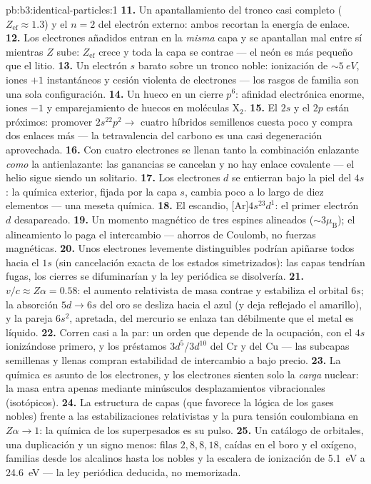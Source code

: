 \begin{solution}{pb:b3:identical-particles:1}
\textbf{11.} Un apantallamiento del tronco casi completo ($Z_{\text{ef}}
\approx 1.3$) y el $n = 2$ del electrón externo: ambos recortan la
energía de enlace.
\textbf{12.} Los electrones añadidos entran en la \emph{misma} capa y se
apantallan mal entre sí mientras $Z$ sube: $Z_{\text{ef}}$ crece
y toda la capa se contrae --- el neón es más pequeño que el litio.
\textbf{13.} Un electrón $s$ barato sobre un tronco noble: ionización de
$\sim\qty{5}{eV}$, iones $+1$ instantáneos y cesión violenta de electrones
--- los rasgos de familia son una sola configuración.
\textbf{14.} Un hueco en un cierre $p^6$: afinidad electrónica
enorme, iones $-1$ y emparejamiento de huecos en moléculas X$_2$.
\textbf{15.} El $2s$ y el $2p$ están próximos: promover $2s^22p^2 \to$
cuatro híbridos semillenos cuesta poco y compra dos enlaces más ---
la tetravalencia del carbono es una casi degeneración aprovechada.
\textbf{16.} Con cuatro electrones se llenan tanto la combinación enlazante
\emph{como} la antienlazante: las ganancias se cancelan y no hay enlace
covalente --- el helio sigue siendo un solitario.
\textbf{17.} Los electrones $d$ se entierran bajo la piel del $4s$: la
química exterior, fijada por la capa $s$, cambia poco a lo largo de
diez elementos --- una meseta química.
\textbf{18.} El escandio, [Ar]$4s^23d^1$: el primer electrón $d$
desapareado.
\textbf{19.} Un momento magnético de tres espines alineados
($\sim3\mu_{\text{B}}$); el alineamiento lo paga el intercambio ---
ahorros de Coulomb, no fuerzas magnéticas.
\textbf{20.} Unos electrones levemente distinguibles podrían apiñarse todos
hacia el $1s$ (sin cancelación exacta de los estados simetrizados): las
capas tendrían fugas, los cierres se difuminarían y la ley periódica se
disolvería.
\textbf{21.} $v/c \approx Z\alpha = 0.58$: el aumento relativista de masa
contrae y estabiliza el orbital $6s$; la absorción $5d \to 6s$ del oro se
desliza hacia el azul (y deja reflejado el amarillo), y la pareja $6s^2$,
apretada, del mercurio se enlaza tan débilmente que el metal es líquido.
\textbf{22.} Corren casi a la par: un orden que depende de la ocupación,
con el $4s$ ionizándose primero, y los préstamos $3d^5$/$3d^{10}$
del Cr y del Cu --- las subcapas semillenas y llenas compran estabilidad de
intercambio a bajo precio.
\textbf{23.} La química es asunto de los electrones, y los
electrones sienten solo la \emph{carga} nuclear: la masa entra apenas
mediante minúsculos desplazamientos vibracionales (isotópicos).
\textbf{24.} La estructura de capas (que favorece la lógica de los gases
nobles) frente a las estabilizaciones relativistas y la pura tensión
coulombiana en $Z\alpha \to 1$: la química de los superpesados es su pulso.
\textbf{25.} Un catálogo de orbitales, una duplicación y un signo
menos: filas $2, 8, 8, 18$, caídas en el boro y el oxígeno, familias desde
los alcalinos hasta los nobles y la escalera de ionización de \qty{5.1}{eV} a
\qty{24.6}{eV} --- la ley periódica deducida, no memorizada.
\end{solution}
